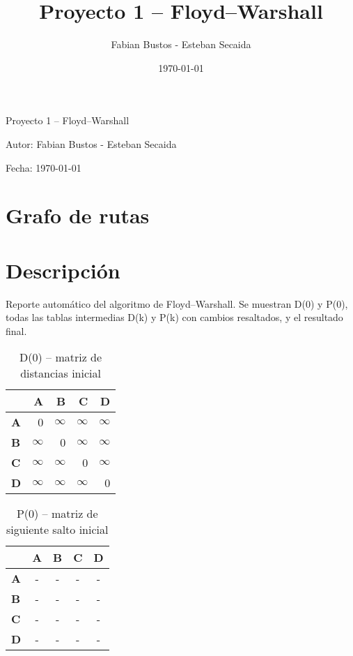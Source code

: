 \documentclass{article}
\title{Proyecto 1 – Floyd–Warshall}
\author{Fabian Bustos - Esteban Secaida}
\date{\today}
\newcommand{\INF}{$\infty$}
\begin{document}
\begin{titlepage}
  \centering
  {\Huge Proyecto 1 – Floyd–Warshall}\par
  \vspace{2cm}
  {\Large Autor: Fabian Bustos - Esteban Secaida}\par
  \vspace{1cm}
  {\large Fecha: \today}\par
\end{titlepage}

\section*{Grafo de rutas}
\section*{Descripción}
Reporte automático del algoritmo de Floyd--Warshall. Se muestran D(0) y P(0), todas las tablas intermedias D(k) y P(k) con cambios resaltados, y el resultado final.

\begin{table}[H]\centering
\caption{D(0) -- matriz de distancias inicial}
\begin{tabular}{l r r r r}
\toprule
 & \textbf{A} & \textbf{B} & \textbf{C} & \textbf{D}\\\midrule
\textbf{A} & 0 & \INF & \INF & \INF \\
\textbf{B} & \INF & 0 & \INF & \INF \\
\textbf{C} & \INF & \INF & 0 & \INF \\
\textbf{D} & \INF & \INF & \INF & 0 \\
\bottomrule
\end{tabular}
\end{table}

\begin{table}[H]\centering
\caption{P(0) -- matriz de siguiente salto inicial}
\begin{tabular}{l c c c c}
\toprule
 & \textbf{A} & \textbf{B} & \textbf{C} & \textbf{D}\\\midrule
\textbf{A} & - & - & - & - \\
\textbf{B} & - & - & - & - \\
\textbf{C} & - & - & - & - \\
\textbf{D} & - & - & - & - \\
\bottomrule
\end{tabular}
\end{table}
\end{document}
